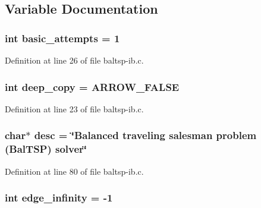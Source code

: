 \subsection{Variable Documentation}
\hypertarget{bin_2baltsp-ib_8c_227b7ec968925f365b96a92ace419c56}{
\subsubsection[{basic\_\-attempts}]{\setlength{\rightskip}{0pt plus 5cm}int {\bf basic\_\-attempts} = 1}}
\label{bin_2baltsp-ib_8c_227b7ec968925f365b96a92ace419c56}




Definition at line 26 of file baltsp-ib.c.\hypertarget{bin_2baltsp-ib_8c_7298da576a5b127d04b4c46b3bc78821}{
\subsubsection[{deep\_\-copy}]{\setlength{\rightskip}{0pt plus 5cm}int {\bf deep\_\-copy} = ARROW\_\-FALSE}}
\label{bin_2baltsp-ib_8c_7298da576a5b127d04b4c46b3bc78821}




Definition at line 23 of file baltsp-ib.c.\hypertarget{bin_2baltsp-ib_8c_3aad16fd4bea1b9717f232ea75ad6449}{
\subsubsection[{desc}]{\setlength{\rightskip}{0pt plus 5cm}char$\ast$ {\bf desc} = \char`\"{}Balanced traveling salesman problem (BalTSP) solver\char`\"{}}}
\label{bin_2baltsp-ib_8c_3aad16fd4bea1b9717f232ea75ad6449}




Definition at line 80 of file baltsp-ib.c.\hypertarget{bin_2baltsp-ib_8c_61a12d5995172f376610cce2f19e5855}{
\subsubsection[{edge\_\-infinity}]{\setlength{\rightskip}{0pt plus 5cm}int {\bf edge\_\-infinity} = -1}}
\label{bin_2baltsp-ib_8c_61a12d5995172f376610cce2f19e5855}




